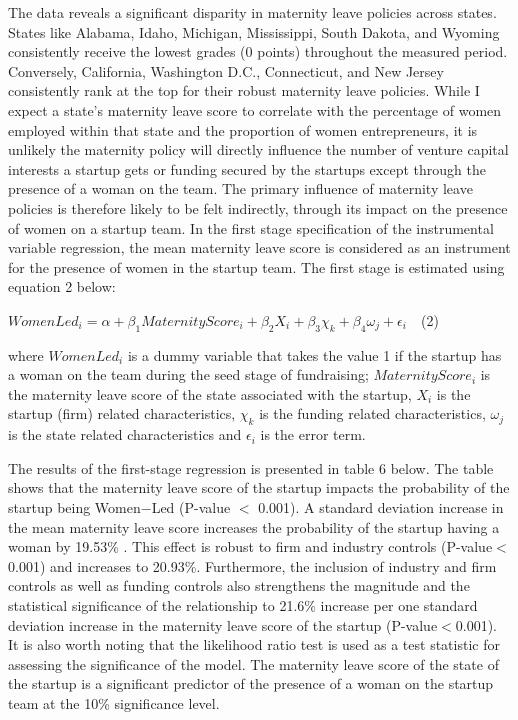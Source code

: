 The data reveals a significant disparity in maternity leave policies across states.  States like Alabama, Idaho, Michigan, Mississippi, South Dakota, and Wyoming consistently receive the lowest grades (0 points) throughout the measured period. Conversely, California, Washington D.C., Connecticut, and New Jersey consistently rank at the top for their robust maternity leave policies. While I expect a state's maternity leave score to correlate with the percentage of women employed within that state and the proportion of women entrepreneurs, it is unlikely the maternity policy will directly influence the number of venture capital interests a startup gets or funding secured by the startups except through the presence of a woman on the team. The primary influence of maternity leave policies is therefore likely to be felt indirectly, through its impact on the presence of women on a startup team. In the first stage specification of the instrumental variable regression, the mean maternity leave score is considered as an instrument for the presence of women in the startup team. The first stage is estimated using equation 2 below: 
\begin{center}
$WomenLed_{i}=\alpha +\beta_1Maternity Score_i+\beta_2X_{i} +\beta_{3}\chi_{k} + \beta_4\omega_{j}  + \epsilon_{i} \quad $(2)$ $
\end{center}

where $WomenLed_{i}$ is a dummy variable that takes the value 1 if the startup has a woman on the team during the seed stage of fundraising;  $Maternity Score_i$ is the maternity leave score of the state associated with the startup, $X_{i}$ is the startup (firm) related characteristics, $\chi_{k}$ is the funding related characteristics, $\omega_{j}$ is the state related characteristics and $\epsilon_{i}$ is the error term. 
        
\hspace *{0mm} The results of the first-stage regression is presented in table 6 below. The table shows that the maternity leave score of the startup impacts the probability of the startup being Women$-$Led (P-value $<$ 0.001). A standard deviation increase in the mean maternity leave score increases the probability of the startup having a woman by 19.53\% . This effect is robust to firm and industry controls (P-value$<$0.001) and increases to 20.93\%. Furthermore, the inclusion of industry and firm controls as well as funding controls also strengthens the magnitude and the statistical significance of the relationship to 21.6\% increase per one standard deviation increase in the maternity leave score of the startup (P-value$<$0.001). It is also worth noting that the likelihood ratio test is used as a test statistic for assessing the significance of the model. The maternity leave score of the state of the startup is a significant predictor of the presence of a woman on the startup team at the 10\% significance level. 

